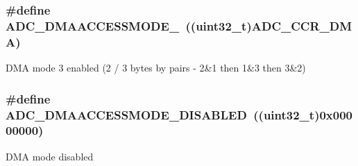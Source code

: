 \subsubsection[{\texorpdfstring{A\+D\+C\+\_\+\+D\+M\+A\+A\+C\+C\+E\+S\+S\+M\+O\+D\+E\+\_\+3}{ADC_DMAACCESSMODE_3}}]{\setlength{\rightskip}{0pt plus 5cm}\#define A\+D\+C\+\_\+\+D\+M\+A\+A\+C\+C\+E\+S\+S\+M\+O\+D\+E\+\_~((uint32\+\_\+t){\bf A\+D\+C\+\_\+\+C\+C\+R\+\_\+\+D\+MA})}\hypertarget{group___a_d_c_ex___direct__memory__access__mode__for__multi__mode_ga2613348408ee2a5685f1d06f6f7780dc}{}\label{group___a_d_c_ex___direct__memory__access__mode__for__multi__mode_ga2613348408ee2a5685f1d06f6f7780dc}
D\+MA mode 3 enabled (2 / 3 bytes by pairs -\/ 2\&1 then 1\&3 then 3\&2) 
\subsubsection[{\texorpdfstring{A\+D\+C\+\_\+\+D\+M\+A\+A\+C\+C\+E\+S\+S\+M\+O\+D\+E\+\_\+\+D\+I\+S\+A\+B\+L\+ED}{ADC_DMAACCESSMODE_DISABLED}}]{\setlength{\rightskip}{0pt plus 5cm}\#define A\+D\+C\+\_\+\+D\+M\+A\+A\+C\+C\+E\+S\+S\+M\+O\+D\+E\+\_\+\+D\+I\+S\+A\+B\+L\+ED~((uint32\+\_\+t)0x00000000)}\hypertarget{group___a_d_c_ex___direct__memory__access__mode__for__multi__mode_ga59163da6d23f587f951ce21d74542795}{}\label{group___a_d_c_ex___direct__memory__access__mode__for__multi__mode_ga59163da6d23f587f951ce21d74542795}
D\+MA mode disabled 